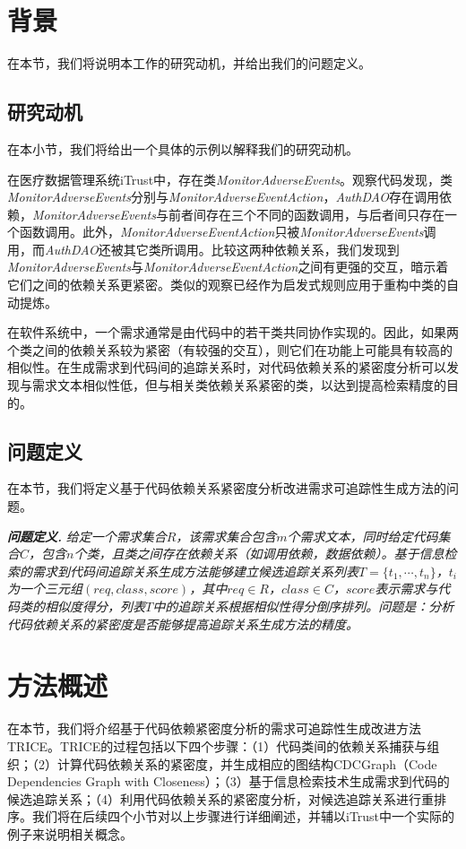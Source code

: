 \section{背景}
在本节，我们将说明本工作的研究动机，并给出我们的问题定义。

\subsection{研究动机}

在本小节，我们将给出一个具体的示例以解释我们的研究动机。

在医疗数据管理系统iTrust中，存在类\emph{MonitorAdverseEvents}。观察代码发现，类\emph{MonitorAdverseEvents}分别与\emph{MonitorAdverseEventAction}，\emph{AuthDAO}存在调用依赖，\emph{MonitorAdverseEvents}与前者间存在三个不同的函数调用，与后者间只存在一个函数调用。此外，\emph{MonitorAdverseEventAction}只被\emph{MonitorAdverseEvents}调用，而\emph{AuthDAO}还被其它类所调用。比较这两种依赖关系，我们发现到\emph{MonitorAdverseEvents}与\emph{MonitorAdverseEventAction}之间有更强的交互，暗示着它们之间的依赖关系更紧密。类似的观察已经作为启发式规则应用于重构中类的自动提炼\cite{bavota2014automating}。

在软件系统中，一个需求通常是由代码中的若干类共同协作实现的。因此，如果两个类之间的依赖关系较为紧密（有较强的交互），则它们在功能上可能具有较高的相似性。在生成需求到代码间的追踪关系时，对代码依赖关系的紧密度分析可以发现与需求文本相似性低，但与相关类依赖关系紧密的类，以达到提高检索精度的目的。

\subsection{问题定义}
在本节，我们将定义基于代码依赖关系紧密度分析改进需求可追踪性生成方法的问题。

\textbf{\emph{问题定义.}} \emph{给定一个需求集合$R$，该需求集合包含$m$个需求文本，同时给定代码集合$C$，包含$n$个类，且类之间存在依赖关系（如调用依赖，数据依赖）。基于信息检索的需求到代码间追踪关系生成方法能够建立候选追踪关系列表$T = \{t_{1}, \cdots, t_{n}\}$，$t_{i}$为一个三元组$(req, class, score)$，其中$req \in R$，$class \in C$，$score$表示需求与代码类的相似度得分，列表$T$中的追踪关系根据相似性得分倒序排列。问题是：分析代码依赖关系的紧密度是否能够提高追踪关系生成方法的精度。}

\section{方法概述}
在本节，我们将介绍基于代码依赖紧密度分析的需求可追踪性生成改进方法TRICE。TRICE的过程包括以下四个步骤：（1）代码类间的依赖关系捕获与组织；（2）计算代码依赖关系的紧密度，并生成相应的图结构CDCGraph（Code Dependencies Graph with Closeness）；（3）基于信息检索技术生成需求到代码的候选追踪关系；（4）利用代码依赖关系的紧密度分析，对候选追踪关系进行重排序。我们将在后续四个小节对以上步骤进行详细阐述，并辅以iTrust中一个实际的例子来说明相关概念。

